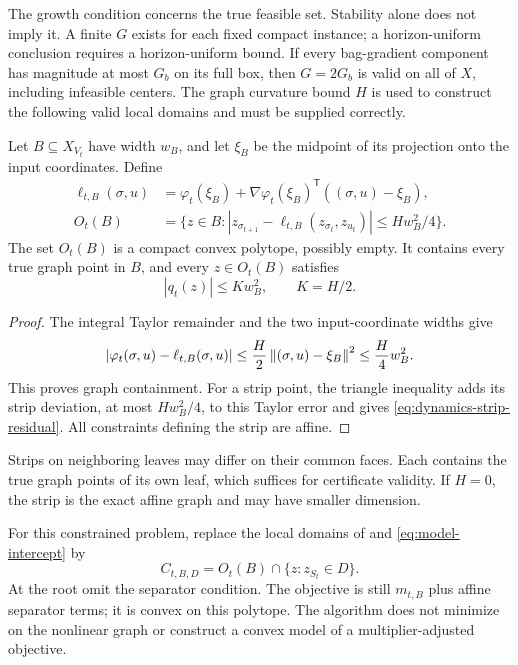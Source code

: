 The growth condition concerns the true feasible set. Stability alone does
not imply it. A finite $G$ exists for each fixed compact instance; a
horizon-uniform conclusion requires a horizon-uniform bound. If every
bag-gradient component has magnitude at most $G_b$ on its full box, then
$G=2G_b$ is valid on all of $X$, including infeasible centers. The graph
curvature bound $H$ is used to construct the following valid local domains
and must be supplied correctly.

\begin{lemma}\label{lem:dynamics-strip}
Let $B\subseteq X_{V_t}$ have width $w_B$, and let $\xi_B$ be the
midpoint of its projection onto the input coordinates. Define
\begin{align}\label{eq:dynamics-strip}
 \ell_{t,B}(\sigma,u)
 &=\varphi_t(\xi_B)+\nabla\varphi_t(\xi_B)^{\mathsf T}
                                  ((\sigma,u)-\xi_B),\\
 O_t(B)&=\{z\in B:
 |z_{\sigma_{t+1}}-\ell_{t,B}(z_{\sigma_t},z_{u_t})|
                                     \le Hw_B^2/4\}.\nonumber
\end{align}
The set $O_t(B)$ is a compact convex polytope, possibly empty. It contains
every true graph point in $B$, and every $z\in O_t(B)$ satisfies
\begin{equation}\label{eq:dynamics-strip-residual}
 |q_t(z)|\le K w_B^2,\qquad K=H/2.
\end{equation}
\end{lemma}
\begin{proof}
The integral Taylor remainder and the two input-coordinate widths give
\[
 |\varphi_t(\sigma,u)-\ell_{t,B}(\sigma,u)|
 \le\frac H2\left\lVert (\sigma,u)-\xi_B\right\rVert^2\le\frac H4w_B^2.
\]
This proves graph containment. For a strip point, the triangle inequality
adds its strip deviation, at most $Hw_B^2/4$, to this Taylor error and
gives \eqref{eq:dynamics-strip-residual}. All constraints defining the
strip are affine.
\end{proof}

Strips on neighboring leaves may differ on their common faces. Each
contains the true graph points of its own leaf, which suffices for
certificate validity. If $H=0$, the strip is the exact affine graph and
may have smaller dimension.

For this constrained problem, replace the local domains of
 and \eqref{eq:model-intercept} by
\begin{equation}\label{eq:dynamics-local-domain}
 C_{t,B,D}=O_t(B)\cap\{z:z_{S_t}\in D\}.
\end{equation}
At the root omit the separator condition. The objective is still
$m_{t,B}$ plus affine separator terms; it is convex on this polytope.
The algorithm does not minimize on the nonlinear graph or construct a
convex model of a multiplier-adjusted objective.

